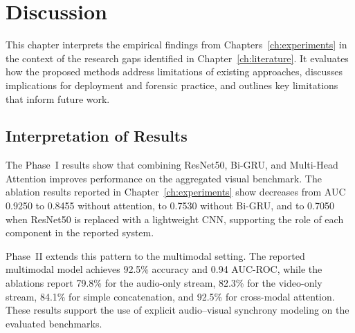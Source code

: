 \chapter{Discussion}
\label{ch:discussion}

This chapter interprets the empirical findings from Chapters~\ref{ch:experiments} in the context of the research gaps identified in Chapter~\ref{ch:literature}. It evaluates how the proposed methods address limitations of existing approaches, discusses implications for deployment and forensic practice, and outlines key limitations that inform future work.

\section{Interpretation of Results}
The Phase~I results show that combining ResNet50, Bi-GRU, and Multi-Head Attention improves performance on the aggregated visual benchmark. The ablation results reported in Chapter~\ref{ch:experiments} show decreases from AUC 0.9250 to 0.8455 without attention, to 0.7530 without Bi-GRU, and to 0.7050 when ResNet50 is replaced with a lightweight CNN, supporting the role of each component in the reported system.

Phase~II extends this pattern to the multimodal setting. The reported multimodal model achieves 92.5\% accuracy and 0.94 AUC-ROC, while the ablations report 79.8\% for the audio-only stream, 82.3\% for the video-only stream, 84.1\% for simple concatenation, and 92.5\% for cross-modal attention. These results support the use of explicit audio--visual synchrony modeling on the evaluated benchmarks.


